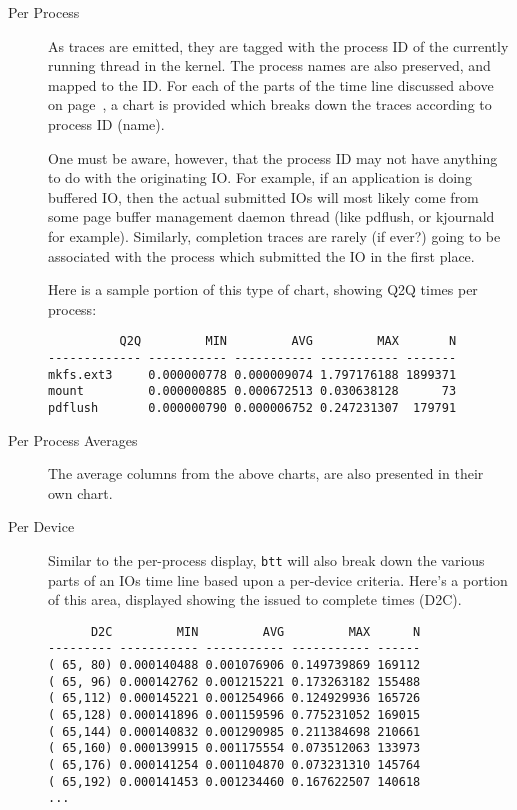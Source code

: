 \documentclass{article}
\begin{document}
\begin{description}
  \item[Per Process] As traces are emitted, they are tagged with the
  process ID of the currently running thread in the kernel. The process
  names are also preserved, and mapped to the ID. For each of the parts
  of the time line discussed above on page~\pageref{tl-defs}, a chart is
  provided which breaks down the traces according to process ID (name).

  One must be aware, however, that the process ID may not have anything
  to do with the originating IO. For example, if an application is
  doing buffered IO, then the actual submitted IOs will most likely
  come from some page buffer management daemon thread (like pdflush,
  or kjournald for example). Similarly, completion traces are rarely
  (if ever?) going to be associated with the process which submitted
  the IO in the first place.

  Here is a sample portion of this type of chart, showing Q2Q times
  per process:

\begin{verbatim}
          Q2Q         MIN         AVG         MAX       N
------------- ----------- ----------- ----------- -------
mkfs.ext3     0.000000778 0.000009074 1.797176188 1899371
mount         0.000000885 0.000672513 0.030638128      73
pdflush       0.000000790 0.000006752 0.247231307  179791
\end{verbatim}

  \item[Per Process Averages] The average columns from the above charts,
  are also presented in their own chart.

  \item[Per Device] Similar to the per-process display, \texttt{btt}
  will also break down the various parts of an IOs time line based upon a
  per-device criteria. Here's a portion of this area, displayed showing
  the issued to complete times (D2C).

\begin{verbatim}
      D2C         MIN         AVG         MAX      N
--------- ----------- ----------- ----------- ------
( 65, 80) 0.000140488 0.001076906 0.149739869 169112
( 65, 96) 0.000142762 0.001215221 0.173263182 155488
( 65,112) 0.000145221 0.001254966 0.124929936 165726
( 65,128) 0.000141896 0.001159596 0.775231052 169015
( 65,144) 0.000140832 0.001290985 0.211384698 210661
( 65,160) 0.000139915 0.001175554 0.073512063 133973
( 65,176) 0.000141254 0.001104870 0.073231310 145764
( 65,192) 0.000141453 0.001234460 0.167622507 140618
...
\end{verbatim}


\end{description}
\end{document}
